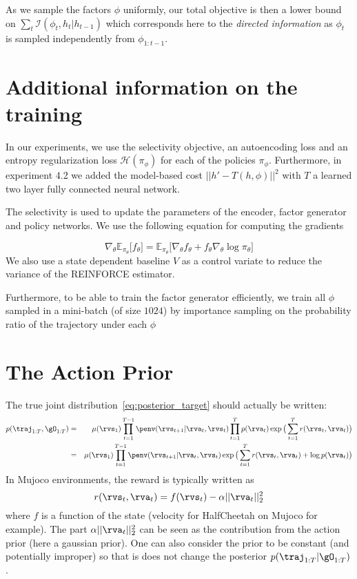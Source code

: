 As we sample the factors $\phi$ uniformly, our total objective is then a lower bound on $\sum_t \mathcal{I}(\phi_t, h_t | h_{t-1})$ which corresponds here to the \emph{directed information} \citep{massey1990causality} \cite{ziebart2010modeling} as $\phi_t$ is sampled independently from $\phi_{1:t-1}$.




\section{Additional information on the training}

In our experiments, we use the selectivity objective, an autoencoding loss and an entropy regularization loss $\mathcal{H}(\pi_\phi)$ for each of the policies $\pi_\phi$. Furthermore, in experiment 4.2 we added the model-based cost $||h' - T(h, \phi)||^2$ with $T$ a learned two layer fully connected neural network.

The selectivity is used to update the parameters of the encoder, factor generator and policy networks.
We use the following equation for computing the gradients

$$\nabla_\theta \mathbb{E}_{\pi_\theta} \big[ f_\theta \big] =  \mathbb{E}_{\pi_\theta} \big[ \nabla_\theta f_\theta + f_\theta \nabla_\theta \log \pi_\theta \big]$$ 
We also use a state dependent baseline $V$ as a control variate to reduce the variance of the REINFORCE estimator.

Furthermore, to be able to train the factor generator efficiently, we train all $\phi$ sampled in a mini-batch (of size $1024$) by importance sampling on the probability ratio of the trajectory under each $\phi$
 
 
 \label{appendix:one}

\section{The Action Prior}
\label{app:action_prior}

The true joint distribution~\ref{eq:posterior_target} should actually be written:
\begin{eqnarray*}
\label{eq:true_posterior_target}
p(\traj_{1:T}, \gO_{1:T}) &=& \mu(\rvs_1) \prod_{t=1}^{T-1} \penv(\rvs_{t+1}|\rva_t, \rvs_t) \prod_{t=1}^{T} p(\rva_t) \exp\big(\sum_{t=1}^{T} r(\rvs_t, \rva_t)\big) \\
&=& \mu(\rvs_1) \prod_{t=1}^{T-1} \penv(\rvs_{t+1}|\rva_t, \rvs_t)\exp\big(\sum_{t=1}^{T} r(\rvs_t, \rva_t) + \log p(\rva_t)\big) \\
\end{eqnarray*}
In Mujoco environments, the reward is typically written as 
$$r(\rvs_t, \rva_t) = f(\rvs_t) - \alpha ||\rva_t||_2^2 $$
where $f$ is a function of the state (velocity for HalfCheetah on Mujoco for example). The part $\alpha ||\rva_t||_2^2$ can be seen as the contribution from the action prior (here a gaussian prior).
One can also consider the prior to be constant (and potentially improper) so that is does not change the posterior $p(\traj_{1:T}| \gO_{1:T})$.


